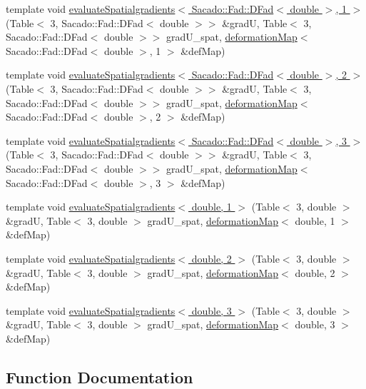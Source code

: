 \begin{DoxyCompactItemize}
\item 
template void \hyperlink{function_evaluations_8cc_a31257b0c4b710fb48bf0b70e7b262da9}{evaluate\-Spatialgradients$<$ Sacado\-::\-Fad\-::\-D\-Fad$<$ double $>$, 1 $>$} (Table$<$ 3, Sacado\-::\-Fad\-::\-D\-Fad$<$ double $>$$>$ \&grad\-U, Table$<$ 3, Sacado\-::\-Fad\-::\-D\-Fad$<$ double $>$$>$ grad\-U\-\_\-spat, \hyperlink{structdeformation_map}{deformation\-Map}$<$ Sacado\-::\-Fad\-::\-D\-Fad$<$ double $>$, 1 $>$ \&def\-Map)
\item 
template void \hyperlink{function_evaluations_8cc_ab89d365bd9b7a2124796e27f59a3b190}{evaluate\-Spatialgradients$<$ Sacado\-::\-Fad\-::\-D\-Fad$<$ double $>$, 2 $>$} (Table$<$ 3, Sacado\-::\-Fad\-::\-D\-Fad$<$ double $>$$>$ \&grad\-U, Table$<$ 3, Sacado\-::\-Fad\-::\-D\-Fad$<$ double $>$$>$ grad\-U\-\_\-spat, \hyperlink{structdeformation_map}{deformation\-Map}$<$ Sacado\-::\-Fad\-::\-D\-Fad$<$ double $>$, 2 $>$ \&def\-Map)
\item 
template void \hyperlink{function_evaluations_8cc_a343650e4cd1050b8776d2fec5dfc1804}{evaluate\-Spatialgradients$<$ Sacado\-::\-Fad\-::\-D\-Fad$<$ double $>$, 3 $>$} (Table$<$ 3, Sacado\-::\-Fad\-::\-D\-Fad$<$ double $>$$>$ \&grad\-U, Table$<$ 3, Sacado\-::\-Fad\-::\-D\-Fad$<$ double $>$$>$ grad\-U\-\_\-spat, \hyperlink{structdeformation_map}{deformation\-Map}$<$ Sacado\-::\-Fad\-::\-D\-Fad$<$ double $>$, 3 $>$ \&def\-Map)
\item 
template void \hyperlink{function_evaluations_8cc_a688e887a593bf0c3effebec8495fb849}{evaluate\-Spatialgradients$<$ double, 1 $>$} (Table$<$ 3, double $>$ \&grad\-U, Table$<$ 3, double $>$ grad\-U\-\_\-spat, \hyperlink{structdeformation_map}{deformation\-Map}$<$ double, 1 $>$ \&def\-Map)
\item 
template void \hyperlink{function_evaluations_8cc_a3f479e2f2e28603def984ea4c2e02ad9}{evaluate\-Spatialgradients$<$ double, 2 $>$} (Table$<$ 3, double $>$ \&grad\-U, Table$<$ 3, double $>$ grad\-U\-\_\-spat, \hyperlink{structdeformation_map}{deformation\-Map}$<$ double, 2 $>$ \&def\-Map)
\item 
template void \hyperlink{function_evaluations_8cc_a9c17d7db3f0ade6c01cfb5450b958efc}{evaluate\-Spatialgradients$<$ double, 3 $>$} (Table$<$ 3, double $>$ \&grad\-U, Table$<$ 3, double $>$ grad\-U\-\_\-spat, \hyperlink{structdeformation_map}{deformation\-Map}$<$ double, 3 $>$ \&def\-Map)
\end{DoxyCompactItemize}


\subsection{Function Documentation}
